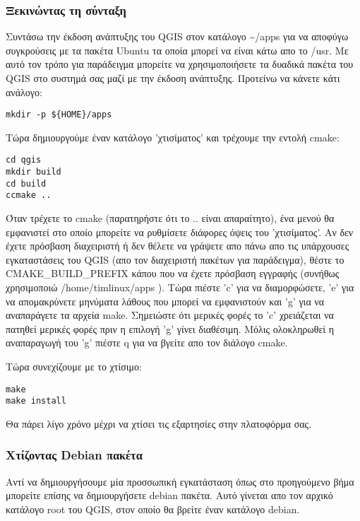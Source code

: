 \hypertarget{toc10}{}
\subsubsection{Ξεκινώντας τη σύνταξη}
Συντάσω την έκδοση ανάπτυξης του QGIS στον κατάλογο \~{}/apps για να αποφύγω συγκρούσεις με τα  πακέτα Ubuntu τα οποία μπορεί να είναι κάτω απο το /usr. Με αυτό τον τρόπο για παράδειγμα μπορείτε να χρησιμοποιήσετε τα δυαδικά πακέτα του QGIS στο συστημά σας μαζί με την έκδοση ανάπτυξης. Προτείνω να κάνετε κάτι ανάλογο:

\begin{verbatim}
mkdir -p ${HOME}/apps 
\end{verbatim}

Τώρα δημιουργούμε έναν κατάλογο 'χτισίματος' και τρέχουμε την εντολή cmake: 

\begin{verbatim}
cd qgis
mkdir build
cd build
ccmake ..
\end{verbatim}

Όταν τρέχετε το cmake (παρατηρήστε ότι το .. είναι απαραίτητο), ένα μενού θα εμφανιστεί στο οποίο μπορείτε να ρυθμίσετε διάφορες όψεις του 'χτισίματος'. Αν δεν έχετε πρόσβαση διαχειριστή ή δεν θέλετε να γράψετε απο πάνω απο τις υπάρχουσες εγκαταστάσεις του QGIS (απο τον διαχειριστή πακέτων για παράδειγμα), θέστε το CMAKE\_BUILD\_PREFIX κάπου που να έχετε πρόσβαση εγγραφής (συνήθως χρησιμοποιώ /home/timlinux/apps
). Τώρα πιέστε 'c' για να διαμορφώσετε, 'e' για να απομακρύνετε μηνύματα λάθους που μπορεί να εμφανιστούν και 'g' για να αναπαράγετε τα αρχεία make. Σημειώστε ότι μερικές φορές το 'c' χρειάζεται να πατηθεί μερικές φορές πριν η επιλογή 'g' γίνει διαθέσιμη. Μόλις ολοκληρωθεί η αναπαραγωγή του 'g' πιέστε q για να βγείτε απο τον διάλογο cmake. 

Tώρα συνεχίζουμε με το χτίσιμο:

\begin{verbatim}
make
make install
\end{verbatim}

Θα πάρει λίγο χρόνο μέχρι να χτίσει τις εξαρτησίες στην πλατοφόρμα σας.

\hypertarget{toc11}{}
\subsubsection{Χτίζοντας Debian πακέτα}
Αντί να δημιουργήσουμε μία προσσωπική εγκατάσταση όπως στο προηγούμενο βήμα μπορείτε επίσης να δημιουργήσετε debian πακέτα. Αυτό γίνεται απο τον αρχικό κατάλογο root του QGIS, στον οποίο θα βρείτε έναν κατάλογο debian.

